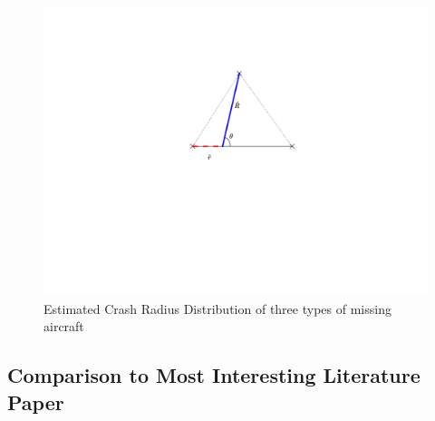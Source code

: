 \documentclass[12pt, letterpaper]{article}  %
\theoremstyle{definition}
\theoremstyle{remark}
\theoremstyle{plain}
\begin{document}
\begin{center}
	\begin{figure}[H]
		\includegraphics[width=0.9\linewidth]{simulation/LocationDensityExplain.png}
		\caption{Estimated Crash Radius Distribution of three types of missing aircraft}
		\label{fig:CrashRadius}
	\end{figure}
\end{center}









\subsection{Comparison to Most Interesting Literature Paper}\label{subsec:hess}

\end{document}
